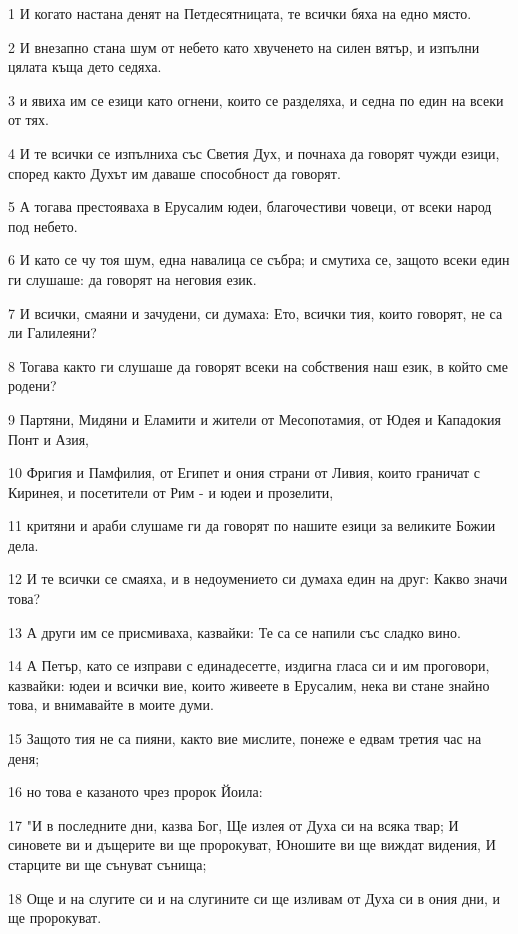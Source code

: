 \par 1 И когато настана денят на Петдесятницата, те всички бяха на едно място.
\par 2 И внезапно стана шум от небето като хвученето на силен вятър, и изпълни цялата къща дето седяха.
\par 3 и явиха им се езици като огнени, които се разделяха, и седна по един на всеки от тях.
\par 4 И те всички се изпълниха със Светия Дух, и почнаха да говорят чужди езици, според както Духът им даваше способност да говорят.
\par 5 А тогава престояваха в Ерусалим юдеи, благочестиви човеци, от всеки народ под небето.
\par 6 И като се чу тоя шум, една навалица се събра; и смутиха се, защото всеки един ги слушаше: да говорят на неговия език.
\par 7 И всички, смаяни и зачудени, си думаха: Ето, всички тия, които говорят, не са ли Галилеяни?
\par 8 Тогава както ги слушаше да говорят всеки на собствения наш език, в който сме родени?
\par 9 Партяни, Мидяни и Еламити и жители от Месопотамия, от Юдея и Кападокия Понт и Азия,
\par 10 Фригия и Памфилия, от Египет и ония страни от Ливия, които граничат с Киринея, и посетители от Рим - и юдеи и прозелити,
\par 11 критяни и араби слушаме ги да говорят по нашите езици за великите Божии дела.
\par 12 И те всички се смаяха, и в недоумението си думаха един на друг: Какво значи това?
\par 13 А други им се присмиваха, казвайки: Те са се напили със сладко вино.
\par 14 А Петър, като се изправи с единадесетте, издигна гласа си и им проговори, казвайки: юдеи и всички вие, които живеете в Ерусалим, нека ви стане знайно това, и внимавайте в моите думи.
\par 15 Защото тия не са пияни, както вие мислите, понеже е едвам третия час на деня;
\par 16 но това е казаното чрез пророк Йоила:
\par 17 "И в последните дни, казва Бог, Ще излея от Духа си на всяка твар; И синовете ви и дъщерите ви ще пророкуват, Юношите ви ще виждат видения, И старците ви ще сънуват сънища;
\par 18 Още и на слугите си и на слугините си ще изливам от Духа си в ония дни, и ще пророкуват.
